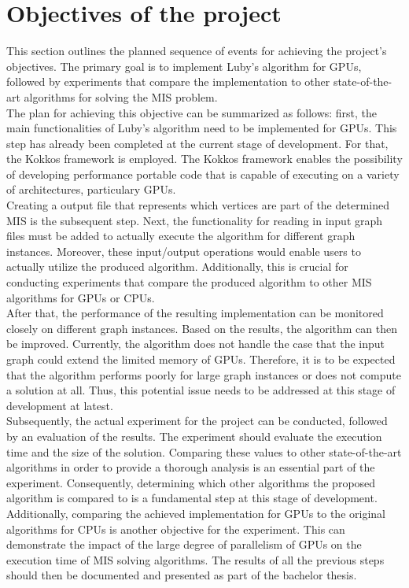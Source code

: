 \documentclass[acmsmall,nonacm,screen,review]{acmart}
\begin{document}
\section{Objectives of the project}
This section outlines the planned sequence of events for achieving the project's objectives. The primary goal is to implement Luby's algorithm for GPUs, followed by experiments that compare the implementation to other state-of-the-art algorithms for solving the MIS problem.\\
The plan for achieving this objective can be summarized as follows: first, the main functionalities of Luby's algorithm need to be implemented for GPUs. This step has already been completed at the current stage of development. For that, the Kokkos framework \cite{Kokkos,Kokkos_basic} is employed. The Kokkos framework enables the possibility of developing performance portable code that is capable of executing on a variety of architectures, particulary GPUs.\\
Creating a output file that represents which vertices are part of the determined MIS is the subsequent step. Next, the functionality for reading in input graph files must be added to actually execute the algorithm for different graph instances. Moreover, these input/output operations would enable users to actually utilize the produced algorithm. Additionally, this is crucial for conducting experiments that compare the produced algorithm to other MIS algorithms for GPUs or CPUs. \\
After that, the performance of the resulting implementation can be monitored closely on different graph instances. Based on the results, the algorithm can then be improved. Currently, the algorithm does not handle the case that the input graph could extend the limited memory of GPUs. Therefore, it is to be expected that the algorithm performs poorly for large graph instances or does not compute a solution at all. Thus, this potential issue needs to be addressed at this stage of development at latest. \\
Subsequently, the actual experiment for the project can be conducted, followed by an evaluation of the results. The experiment should evaluate the execution time and the size of the solution. Comparing these values to other state-of-the-art algorithms in order to provide a thorough analysis is an essential part of the experiment. Consequently, determining which other algorithms the proposed algorithm is compared to is a fundamental step at this stage of development. Additionally, comparing the achieved implementation for GPUs to the original algorithms for CPUs is another objective for the experiment. This can demonstrate the impact of the large degree of parallelism of GPUs on the execution time of MIS solving algorithms. The results of all the previous steps should then be documented and presented as part of the bachelor thesis. \\
\end{document}
